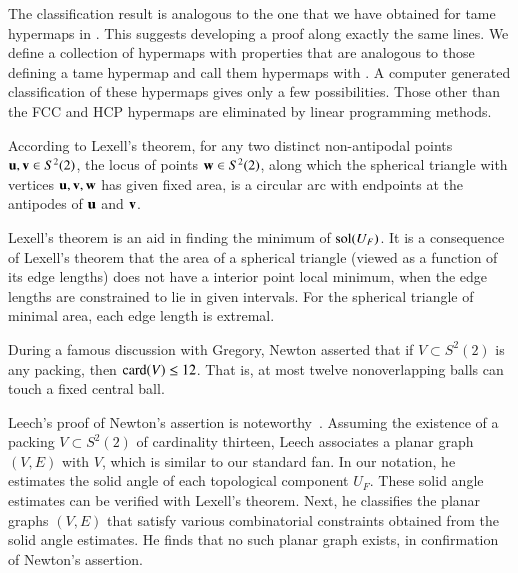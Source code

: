\documentclass{llncs}
\begin{document}
The classification result is analogous to the one that we have 
obtained for tame hypermaps in \cite{DSP}.  
This suggests developing a proof along
exactly the same lines.  We define a 
collection of hypermaps with properties that are analogous to those
defining a tame hypermap and call them hypermaps with 
.  A computer generated classification of these hypermaps
gives only a few possibilities.  Those other than the FCC and
HCP hypermaps are eliminated by linear programming methods.


\begin{remark}
According to Lexell's theorem, for any two distinct non-antipodal points ${\mathbf u},{\mathbf v}\in S^2(2)$,
the locus of points ${\mathbf w}\in S^2(2)$, along which
the spherical triangle with vertices ${\mathbf u},{\mathbf v},{\mathbf w}$ has given fixed area, is a circular arc
with endpoints at the antipodes of ${\mathbf u}$ and ${\mathbf v}$.

Lexell's theorem is an aid in finding the minimum of
  $\operatorname{sol}(U_F)$.
  It is a consequence of Lexell's theorem that the area of a spherical
  triangle (viewed as a function of its edge lengths) does not have a
  interior point local minimum, when the edge lengths are
  constrained to lie in given intervals.  For the spherical triangle of minimal area,
each  edge length is extremal.
%
%
\end{remark}

\begin{remark}
During a famous discussion with Gregory, Newton asserted that 
if $V\subset S^2(2)$ is any packing, then ${\hbox{card}}(V)\le 12$. That is, at most
twelve nonoverlapping balls can touch a fixed central ball.  
%
%
%
%
  
 Leech's proof of Newton's assertion is
noteworthy~\cite{Leech:1956:MG}.  Assuming the existence of a packing
$V\subset S^2(2)$ of cardinality thirteen, Leech associates a planar graph
$(V,E)$ with $V$, which is similar to our standard fan.  In
our notation, he estimates the solid angle of each topological
component $U_F$.  These solid angle estimates can be verified with Lexell's theorem.
Next, he classifies the planar graphs $(V,E)$ that satisfy various
combinatorial constraints obtained from the solid angle estimates. He
finds that no such planar graph exists, in confirmation of Newton's
assertion.
\end{remark}
\end{document}
